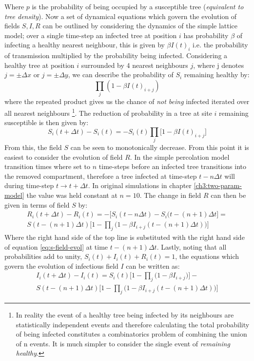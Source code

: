 Where $p$ is the probability of being occupied by a susceptible tree (\textit{equivalent to tree density}). Now a set of dynamical equations which govern the evolution of fields $S,I,R$ can be outlined by considering the dynamics of the simple lattice model; over a single time-step an infected tree at position $i$ has probability $\beta$ of infecting a healthy nearest neighbour, this is given by $\beta I(t)_i$ i.e. the probability of transmission multiplied by the probability being infected. Considering a healthy tree at position $i$ surrounded by 4 nearest neighbours $j$, where j denotes $j= \pm \Delta x $ or $ j=\pm \Delta y$, we can describe the probability of $S_i$ remaining healthy by: 
\begin{equation}
    \prod_j (1 - \beta I(t)_{i+j})
    \label{eq:rep-prod-S}
\end{equation}{}
where the repeated product gives us the chance of \textit{not being} infected iterated over all nearest neighbours \footnote{In reality the event of a healthy tree being infected by its neighbours are statistically independent events and therefore calculating the total probability of being infected constitutes a combinatorics problem of combining the union of n events. It is much simpler to consider the single event of \textit{remaining healthy}.}. The reduction of probability in a tree at site $i$ remaining susceptible is then given by:
\begin{equation}
    S_i(t+\Delta t) - S_i(t) =  - S_i(t)\prod_j \Big [1 - \beta I(t)_{i+j} \Big ] 
    \label{eq:s-field-evol}
\end{equation}{}
From this, the field $S$ can be seen to monotonically decrease. From this point it is easiest to consider the evolution of field $R$. In the simple percolation model transition times where set to $n$ time-steps before an infected tree transitions into the removed compartment, therefore a tree infected at time-step $t-n\Delta t$ will during time-step $t \rightarrow t + \Delta t$. In original simulations in chapter \ref{ch3:two-param-model} the value was held constant at $n = 10$. The change in field $R$ can then be given in terms of field $S$ by:
\begin{multline}
     R_i(t+\Delta t) - R_i(t)  = -\Big[S_i(t - n\Delta t) - S_i(t-(n+1)\Delta t\Big] = \\
     S(t - (n+1)\Delta t) \Big[ 1 - \prod_j \big(1 - \beta I_{i+j}(t - (n+1)\Delta t)\big)\Big]
     \label{eq:r-field-evol}
\end{multline}
Where the right hand side of the top line is substituted with the right hand side of equation \ref{eq:s-field-evol} at time $t-(n+1)\Delta t$. Lastly, noting that all probabilities add to unity, $S_i(t) + I_i(t) + R_i(t) = 1$, the equations which govern the evolution of infectious field $I$ can be written as:
\begin{multline}
    I_i(t+\Delta t) - I_i(t) = S_i(t)\Big[1 - \prod_j\big( 1 - \beta I_{i+j}\big)\Big] - \\ S(t - (n+1)\Delta t) \Big[ 1 - \prod_j \big(1 - \beta I_{i+j}(t - (n+1)\Delta t)\big)\Big]
    \label{eq:i-field-evol}
\end{multline}

